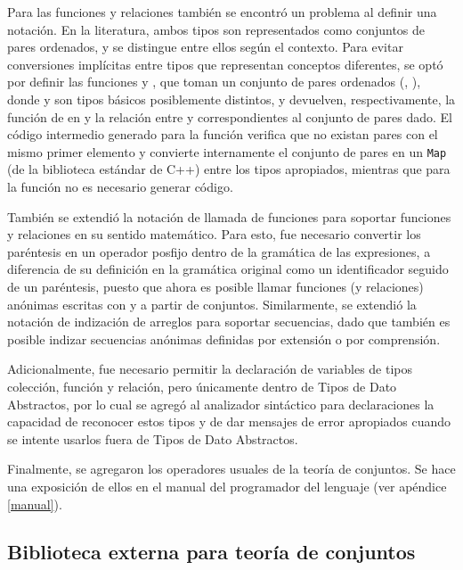 {{Para las funciones y relaciones también se encontró un problema al definir una
notación. En la literatura, ambos tipos son representados como conjuntos de
pares ordenados, y se distingue entre ellos según el contexto. Para evitar
conversiones implícitas entre tipos que representan conceptos diferentes, se
optó por definir las funciones  y , que toman un conjunto
de pares ordenados (, ), donde  y  son tipos
básicos posiblemente distintos, y devuelven, respectivamente, la función de
 en  y la relación entre  y 
correspondientes al conjunto de pares dado. El código intermedio generado para
la función  verifica que no existan pares con el mismo primer
elemento y convierte internamente el conjunto de pares en un \texttt{Map} (de la
biblioteca estándar de C++) entre los tipos apropiados, mientras que para la
función  no es necesario generar código.

También se extendió la notación de llamada de funciones para soportar funciones
y relaciones en su sentido matemático. Para esto, fue necesario convertir los
paréntesis en un operador posfijo dentro de la gramática de las expresiones, a
diferencia de su definición en la gramática original como un identificador
seguido de un paréntesis, puesto que ahora es posible llamar funciones (y
relaciones) anónimas escritas con  y  a partir de
conjuntos. Similarmente, se extendió la notación de indización de arreglos para
soportar secuencias, dado que también es posible indizar secuencias anónimas
definidas por extensión o por comprensión.

Adicionalmente, fue necesario permitir la declaración de variables de tipos
colección, función y relación, pero únicamente dentro de Tipos de Dato
Abstractos, por lo cual se agregó al analizador sintáctico para declaraciones la
capacidad de reconocer estos tipos y de dar mensajes de error apropiados cuando
se intente usarlos fuera de Tipos de Dato Abstractos.

Finalmente, se agregaron los operadores usuales de la teoría de conjuntos. Se
hace una exposición de ellos en el manual del programador del lenguaje 
(ver apéndice \ref{manual}).

\subsection{Biblioteca externa para teoría de conjuntos}

}}
